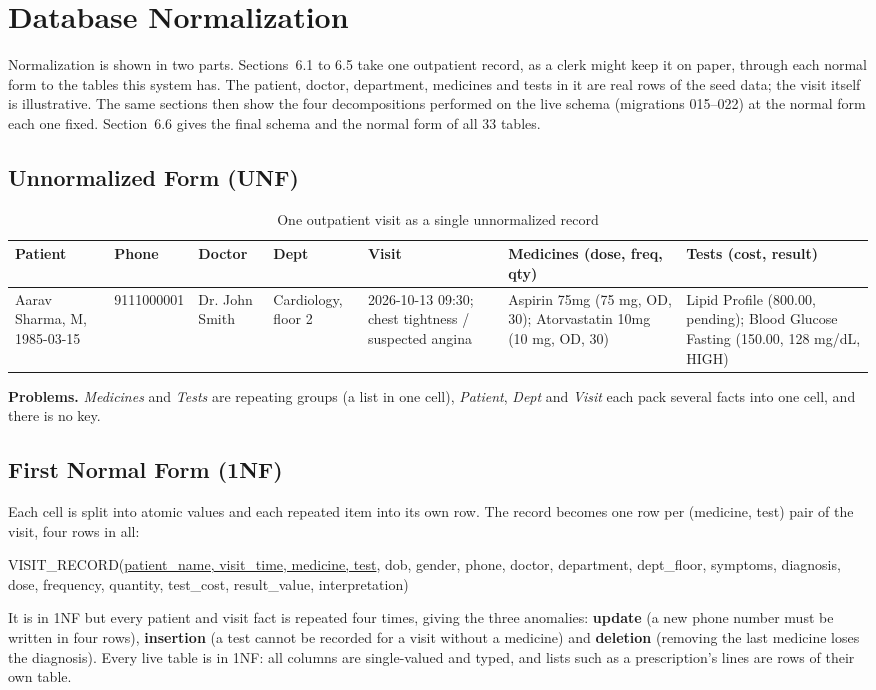 \chapter{Database Normalization}
Normalization is shown in two parts. Sections~6.1 to 6.5 take one outpatient record, as a clerk might keep it on
paper, through each normal form to the tables this system has. The patient, doctor, department, medicines and tests
in it are real rows of the seed data; the visit itself is illustrative. The same sections then show the
four decompositions performed on the live schema (migrations 015--022) at the normal form each one fixed.
Section~6.6 gives the final schema and the normal form of all 33 tables.

\section{Unnormalized Form (UNF)}
\begin{table}[H]\centering\scriptsize\setlength{\tabcolsep}{3pt}
\caption{One outpatient visit as a single unnormalized record}\label{tab:unf}
\begin{tabular}{@{}p{2.1cm}p{1.5cm}p{2.0cm}p{1.6cm}p{2.3cm}p{3.1cm}p{3.3cm}@{}}
\toprule
\textbf{Patient} & \textbf{Phone} & \textbf{Doctor} & \textbf{Dept} & \textbf{Visit} & \textbf{Medicines (dose, freq, qty)} & \textbf{Tests (cost, result)} \\\midrule
Aarav Sharma, M, 1985-03-15 & 9111000001 & Dr. John Smith & Cardiology, floor 2 & 2026-10-13 09:30; chest tightness / suspected angina & Aspirin 75mg (75 mg, OD, 30); Atorvastatin 10mg (10 mg, OD, 30) & Lipid Profile (800.00, pending); Blood Glucose Fasting (150.00, 128 mg/dL, HIGH) \\
\bottomrule
\end{tabular}
\end{table}
\textbf{Problems.} \emph{Medicines} and \emph{Tests} are repeating groups (a list in one cell), \emph{Patient},
\emph{Dept} and \emph{Visit} each pack several facts into one cell, and there is no key.

\section{First Normal Form (1NF)}
Each cell is split into atomic values and each repeated item into its own row. The record becomes one row per
(medicine, test) pair of the visit, four rows in all:
\begin{center}\scriptsize
VISIT\_RECORD(\underline{patient\_name, visit\_time, medicine, test}, dob, gender, phone, doctor, department, dept\_floor,
symptoms, diagnosis, dose, frequency, quantity, test\_cost, result\_value, interpretation)
\end{center}
It is in 1NF but every patient and visit fact is repeated four times, giving the three anomalies:
\textbf{update} (a new phone number must be written in four rows), \textbf{insertion} (a test cannot be recorded
for a visit without a medicine) and \textbf{deletion} (removing the last medicine loses the diagnosis).
Every live table is in 1NF: all columns are single-valued and typed, and lists such as a prescription's lines
are rows of their own table.

